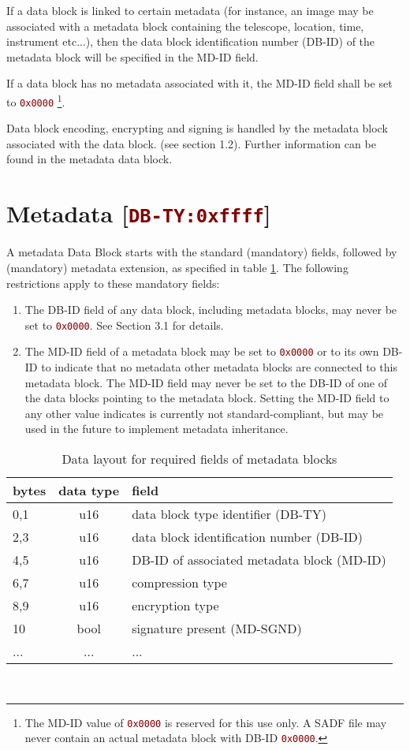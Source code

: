 \documentclass[pagesize=a4]{tufte-book}
\newcommand{\hlred}[1]{\textcolor{Maroon}{#1}}%
\newcommand{\hex}[1]{\hlred{\texttt{#1}}}%
\begin{document}
If a data block is linked to certain metadata (for instance, an image may be 
associated with a metadata block containing the telescope, location, time, instrument etc...), then the data block identification number (DB-ID) of the metadata block will be specified in the MD-ID field.

If a data block has no metadata associated with it, the MD-ID field shall be set to \hex{0x0000} \footnote{The MD-ID value of \hex{0x0000} is reserved for this use only. A SADF file may never contain an actual metadata block with DB-ID \hex{0x0000}.}.

Data block encoding, encrypting and signing is handled by the metadata block
associated with the data block. (see section 1.2). Further information can be
found in the metadata data block.

\section{Metadata [\hex{DB-TY:0xffff}]}
\label{DBTY:0xffff}
A metadata Data Block starts with the standard (mandatory) fields, followed by (mandatory) metadata extension, as specified in table \ref{tab:metadata_fields}. The following restrictions apply to these mandatory fields:
\begin{enumerate}
	\item The DB-ID field of any data block, including metadata blocks, may never be set to \hex{0x0000}. See Section 3.1 for details.
	\item The MD-ID field of a metadata block may be set to \hex{0x0000} or to its own DB-ID to indicate that no metadata other metadata blocks are connected to this metadata block. The MD-ID field may never be set to the DB-ID of one of the data blocks pointing to the metadata block. Setting the MD-ID field to	any other value indicates is currently not standard-compliant, but may be used in the future to implement metadata inheritance.
\end{enumerate}

\begin{table}[ht]
	\centering
	\selectfont
	\begin{tabular}{lcl}
		\toprule
		bytes & data type & field\\
		\midrule
		0,1 & u16 & data block type identifier (DB-TY)\\
		2,3 & u16 & data block identification number (DB-ID)\\
		4,5 & u16 & DB-ID of associated metadata block (MD-ID)\\
		6,7 & u16 & compression type\\
		8,9 & u16 & encryption type\\
		10 & bool & signature present (MD-SGND)\\
		... & ... & ...\\
		\bottomrule
	\end{tabular}
	~\label{tab:metadata_fields}
	\caption{Data layout for required fields of metadata blocks}	
\end{table}
\vspace{5mm}
\end{document}
